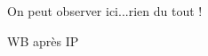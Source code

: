 \begin{figure}
	\caption{WB après IP}{On peut observer ici...rien du tout !}
	\label{fig:WBMuSK}
\end{figure}

